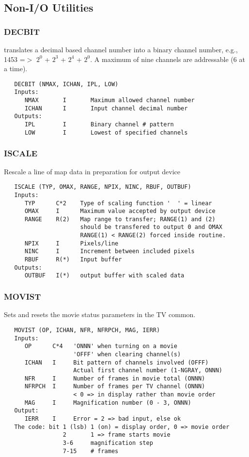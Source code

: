 \subsection{Non-I/O Utilities}

\subsubsection{DECBIT}
translates a decimal based channel number into a binary channel
number, e.g., 1453 =$>$ $2^{0}$ + $2^{3}$ + $2^{4}$ + $2^{0}$.
A maximum of nine channels are addressable (6 at a time).
\begin{verbatim}
   DECBIT (NMAX, ICHAN, IPL, LOW)
   Inputs:
      NMAX       I       Maximum allowed channel number
      ICHAN      I       Input channel decimal number
   Outputs:
      IPL        I       Binary channel # pattern
      LOW        I       Lowest of specified channels
\end{verbatim}

\subsubsection{ISCALE}
Rescale a line of map data in preparation for output device
\begin{verbatim}
   ISCALE (TYP, OMAX, RANGE, NPIX, NINC, RBUF, OUTBUF)
   Inputs:
      TYP      C*2    Type of scaling function '  ' = linear
      OMAX     I      Maximum value accepted by output device
      RANGE    R(2)   Map range to transfer; RANGE(1) and (2)
                      should be transfered to output 0 and OMAX
                      RANGE(1) < RANGE(2) forced inside routine.
      NPIX     I      Pixels/line
      NINC     I      Increment between included pixels
      RBUF     R(*)   Input buffer
   Outputs:
      OUTBUF   I(*)   output buffer with scaled data
\end{verbatim}

\subsubsection{MOVIST}
Sets and resets the movie status parameters in the TV common.
\begin{verbatim}
   MOVIST (OP, ICHAN, NFR, NFRPCH, MAG, IERR)
   Inputs:
      OP      C*4   'ONNN' when turning on a movie
                    'OFFF' when clearing channel(s)
      ICHAN   I     Bit pattern of channels involved (OFFF)
                    Actual first channel number (1-NGRAY, ONNN)
      NFR     I     Number of frames in movie total (ONNN)
      NFRPCH  I     Number of frames per TV channel (ONNN)
                    < 0 => in display rather than movie order
      MAG     I     Magnification number (0 - 3, ONNN)
   Output:
      IERR    I     Error = 2 => bad input, else ok
   The code: bit 1 (lsb) 1 (on) = display order, 0 => movie order
                 2       1 => frame starts movie
                 3-6     magnification step
                 7-15    # frames
\end{verbatim}

